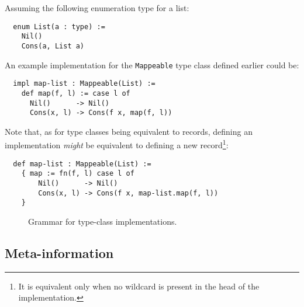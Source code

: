 Assuming the following enumeration type for a list:

\noindent\begin{verbatim}
  enum List(a : type) :=
    Nil()
    Cons(a, List a)
\end{verbatim}
\vspace*{\baselineskip}

\noindent An example implementation for the \verb|Mappeable| type class defined earlier could be:

\noindent\begin{verbatim}
  impl map-list : Mappeable(List) :=
    def map(f, l) := case l of
      Nil()      -> Nil()
      Cons(x, l) -> Cons(f x, map(f, l))
\end{verbatim}
\vspace*{\baselineskip}

Note that, as for type classes being equivalent to records, defining an implementation \textit{might} be equivalent to defining a new record\footnote{It is equivalent only when no wildcard is present in the head of the implementation.}:

\noindent\begin{verbatim}
  def map-list : Mappeable(List) :=
    { map := fn(f, l) case l of
        Nil()      -> Nil()
        Cons(x, l) -> Cons(f x, map-list.map(f, l))
    }
\end{verbatim}

\begin{figure}[H]
  \centering


  \caption{Grammar for type-class implementations.}
  \label{fig:zilch-grammar-declarations-implementation-grammar}
\end{figure}

\subsection{Meta-information}\label{subsec:zilch-grammar-declarations-meta}

